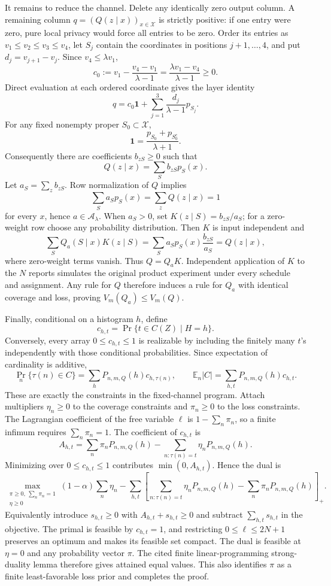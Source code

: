 It remains to reduce the channel.  Delete any identically zero output column.  A remaining column \(q=(Q(z\mid x))_{x\in\mathcal X}\) is strictly positive: if one entry were zero, pure local privacy would force all entries to be zero.  Order its entries as \(v_1\le v_2\le v_3\le v_4\), let \(S_j\) contain the coordinates in positions \(j+1,\ldots,4\), and put \(d_j=v_{j+1}-v_j\).  Since \(v_4\le\lambda v_1\),
\[
 c_0:=v_1-\frac{v_4-v_1}{\lambda-1}
     =\frac{\lambda v_1-v_4}{\lambda-1}\ge0.
\]
Direct evaluation at each ordered coordinate gives the layer identity
\[
 q=c_0\mathbf 1+\sum_{j=1}^3\frac{d_j}{\lambda-1}p_{S_j}.
\]
For any fixed nonempty proper \(S_0\subset\mathcal X\),
\[
 \mathbf 1=\frac{p_{S_0}+p_{S_0^c}}{\lambda+1}.
\]
Consequently there are coefficients \(b_{zS}\ge0\) such that
\[
 Q(z\mid x)=\sum_S b_{zS}p_S(x).
\]
Let \(a_S=\sum_zb_{zS}\).  Row normalization of \(Q\) implies
\[
 \sum_Sa_Sp_S(x)=\sum_zQ(z\mid x)=1
\]
for every \(x\), hence \(a\in\mathcal A_\lambda\).  When \(a_S>0\), set \(K(z\mid S)=b_{zS}/a_S\); for a zero-weight row choose any probability distribution.  Then \(K\) is input independent and
\[
 \sum_SQ_a(S\mid x)K(z\mid S)
 =\sum_Sa_Sp_S(x)\frac{b_{zS}}{a_S}=Q(z\mid x),
\]
where zero-weight terms vanish.  Thus \(Q=Q_aK\).  Independent application of \(K\) to the \(N\) reports simulates the original product experiment under every schedule and assignment.  Any rule for \(Q\) therefore induces a rule for \(Q_a\) with identical coverage and loss, proving \(V_m(Q_a)\le V_m(Q)\).

Finally, conditional on a histogram \(h\), define
\[
 c_{h,t}=\Pr\{t\in C(Z)\mid H=h\}.
\]
Conversely, every array \(0\le c_{h,t}\le1\) is realizable by including the finitely many \(t\)'s independently with those conditional probabilities.  Since expectation of cardinality is additive,
\[
 \Pr_n\{\tau(n)\in C\}=\sum_hP_{n,m,Q}(h)c_{h,\tau(n)},
 \qquad
 \mathbb E_n|C|=\sum_{h,t}P_{n,m,Q}(h)c_{h,t}.
\]
These are exactly the constraints in the fixed-channel program.  Attach multipliers \(\eta_n\ge0\) to the coverage constraints and \(\pi_n\ge0\) to the loss constraints.  The Lagrangian coefficient of the free variable \(\ell\) is \(1-\sum_n\pi_n\), so a finite infimum requires \(\sum_n\pi_n=1\).  The coefficient of \(c_{h,t}\) is
\[
 A_{h,t}=\sum_n\pi_nP_{n,m,Q}(h)
 -\sum_{n:\tau(n)=t}\eta_nP_{n,m,Q}(h).
\]
Minimizing over \(0\le c_{h,t}\le1\) contributes \(\min(0,A_{h,t})\).  Hence the dual is
\[
 \max_{\substack{\pi\ge0,\ \sum_n\pi_n=1\\ \eta\ge0}}
 (1-\alpha)\sum_n\eta_n-
 \sum_{h,t}\left[
 \sum_{n:\tau(n)=t}\eta_nP_{n,m,Q}(h)-
 \sum_n\pi_nP_{n,m,Q}(h)
 \right]_+.
\]
Equivalently introduce \(s_{h,t}\ge0\) with \(A_{h,t}+s_{h,t}\ge0\) and subtract \(\sum_{h,t}s_{h,t}\) in the objective.  The primal is feasible by \(c_{h,t}=1\), and restricting \(0\le\ell\le2N+1\) preserves an optimum and makes its feasible set compact.  The dual is feasible at \(\eta=0\) and any probability vector \(\pi\).  The cited finite linear-programming strong-duality lemma therefore gives attained equal values.  This also identifies \(\pi\) as a finite least-favorable loss prior and completes the proof.

